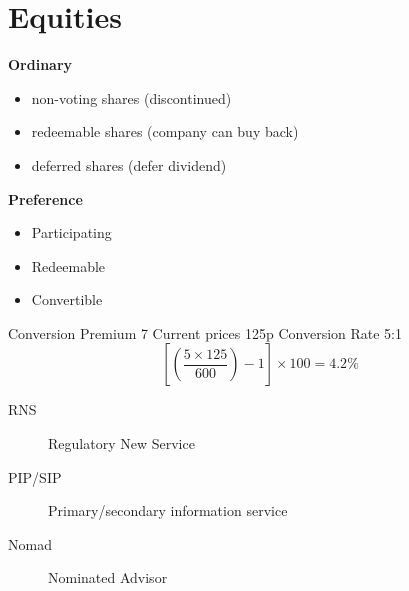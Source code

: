 \section{Equities}

\textbf{Ordinary}
\begin{itemize}
\item non-voting shares (discontinued)
\item redeemable shares (company can buy back)
\item deferred shares (defer dividend)
\end{itemize}

\textbf{Preference}
\begin{itemize}
\item Participating
\item Redeemable
\item Convertible
\end{itemize}


 Conversion Premium 
 7%
 Current prices 125p
 Conversion Rate 5:1
 \[  
 \left[ \left( \frac{5 \times 125}{600}  \right) - 1 \right] \times 100 = 4.2\%
 \]
 
 
 \begin{description}
 \item[RNS] Regulatory New Service
 \item[PIP/SIP] Primary/secondary information service
 \item[Nomad] Nominated Advisor
 \end{description}
 
